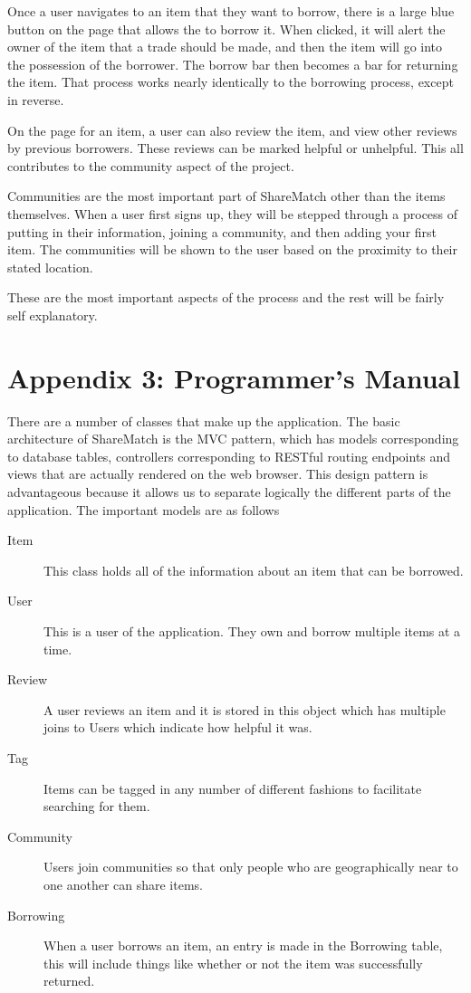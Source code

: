 \documentclass{acm_proc_article-sp}
\begin{document}
Once a user navigates to an item that they want to borrow, there is a large blue button on the page that allows the to borrow it.  When clicked, it will alert the owner of the item that a trade should be made, and then the item will go into the possession of the borrower.  The borrow bar then becomes a bar for returning the item.  That process works nearly identically to the borrowing process, except in reverse.

On the page for an item, a user can also review the item, and view other reviews by previous borrowers.   These reviews can be marked helpful or unhelpful.  This all contributes to the community aspect of the project.  

Communities are the most important part of ShareMatch other than the items themselves.  When a user first signs up, they will be stepped through a process of putting in their information, joining a community, and then adding your first item.  The communities will be shown to the user based on the proximity to their stated location.

These are the most important aspects of the process and the rest will be fairly self explanatory.
\section{Appendix 3: Programmer's Manual}
There are a number of classes that make up the application.  The basic architecture of ShareMatch is the MVC pattern, which has models corresponding to database tables, controllers corresponding to RESTful routing endpoints and views that are actually rendered on the web browser.  This design pattern is advantageous because it allows us to separate logically the different parts of the application.  The important models are as follows

\begin{description}
\item[Item] This class holds all of the information about an item that can be borrowed.
\item[User] This is a user of the application. They own and borrow multiple items at a time.
\item[Review] A user reviews an item and it is stored in this object which has multiple joins to Users which indicate how helpful it was.
\item[Tag] Items can be tagged in any number of different fashions to facilitate searching for them.
\item[Community] Users join communities so that only people who are geographically near to one another can share items.
\item[Borrowing]  When a user borrows an item, an entry is made in the Borrowing table, this will include things like whether or not the item was successfully returned.
\end{description}
\end{document}
